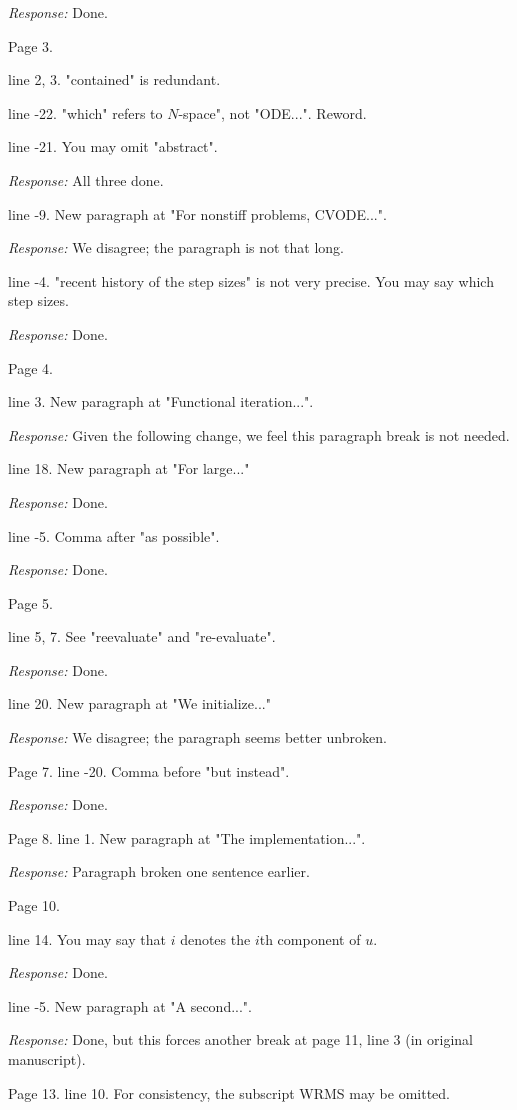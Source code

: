 \documentclass[12pt]{letter}
\begin{document}
{\em Response: } Done.

Page 3.

line 2, 3. "contained" is redundant.

line -22. "which" refers to $N$-space", not "ODE...". Reword.

line -21. You may omit "abstract".

{\em Response:} All three done.

line -9. New paragraph at "For nonstiff problems, CVODE...".

{\em Response:} We disagree; the paragraph is not that long.

line -4. "recent history of the step sizes" is not very precise. You
may say which step sizes.

{\em Response:} Done.

Page 4.

line 3. New paragraph at "Functional iteration...".

{\em Response:} Given the following change, we feel this paragraph
break is not needed.

line 18. New paragraph at "For large..."

{\em Response:} Done.

line -5. Comma after "as possible".

{\em Response:} Done.

Page 5.

line 5, 7. See "reevaluate" and "re-evaluate".

{\em Response:} Done.

line 20. New paragraph at "We initialize..."

{\em Response:} We disagree; the paragraph seems better unbroken.

Page 7.
line -20. Comma before "but instead".

{\em Response:} Done.

Page 8.
line 1. New paragraph at "The implementation...".

{\em Response:} Paragraph broken one sentence earlier.

Page 10.

line 14. You may say that $i$ denotes the $i$th component of $u$.

{\em Response: } Done.

line -5. New paragraph at "A second...".

{\em Response:} Done, but this forces another break at page 11, line 3
(in original manuscript).

Page 13.
line 10. For consistency, the subscript WRMS may be omitted.
\end{document}
